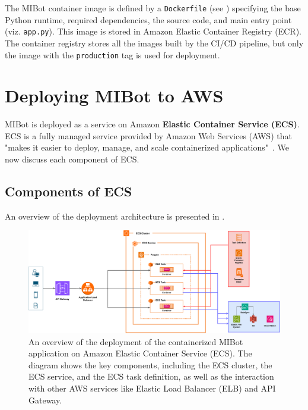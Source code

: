 The MIBot container image is defined by a \texttt{Dockerfile} (see ) specifying the base Python runtime, required dependencies, the source code, and main entry point (viz. \texttt{app.py}). This image is stored in Amazon Elastic Container Registry (ECR). The container registry stores all the images built by the CI/CD pipeline, but only the image with the \texttt{production} tag is used for deployment.

\section{Deploying MIBot to AWS}
\label{sec:mibot-deployment}

MIBot is deployed as a service on Amazon \textbf{Elastic Container Service (ECS)}. ECS is a fully managed service provided by Amazon Web Services (AWS) that "makes it easier to deploy, manage, and scale containerized applications"~\citep{aws-ecs-getting-started}. We now discuss each component of ECS.

\subsection{Components of ECS}
An overview of the deployment architecture is presented in .
\begin{figure}[ht]
	\centering
	\includegraphics[width=0.99\linewidth]{fig/deployment.drawio.pdf}
	\caption[MIBot Deployment on AWS ECS]{An overview of the deployment of the containerized MIBot application on Amazon Elastic Container Service (ECS). The diagram shows the key components, including the ECS cluster, the ECS service, and the ECS task definition, as well as the interaction with other AWS services like Elastic Load Balancer (ELB) and API Gateway.}
	\label{fig:ecs-components}
\end{figure}

